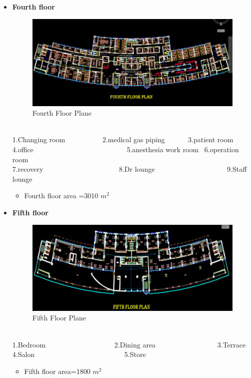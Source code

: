 \documentclass[12pt,fleqn]{book} %
\begin{document}
\begin{itemize}
	    \item \textbf{Fourth floor} 
	     \begin{figure}[h!]
    \centering
    \includegraphics[width=0.8\linewidth]{i 6.png}
    \caption{ Fourth Floor Plane}
    \label{fig:i 6}
\end{figure}

\\1.Changing room \ \ \ \ \ \ \ \ \ \  2.medical gas piping \ \ \ \ \ \  3.patient room
\\4.office \ \ \ \ \ \ \ \ \ \ \ \ \ \ \ \ \ \ \ \ \ \ \ \ \ \ 5.anesthesia work room \  6.operation room
\\7.recovery \ \ \ \ \ \ \ \ \ \ \ \ \ \ \ \ \ \ \ \ \ 8.Dr lounge \ \ \ \ \ \ \ \ \ \ \ \ \ \ \  \ \ \ \ \  9.Staff lounge
\begin{itemize}
    \item Fourth floor area =3010 $m^2$
\end{itemize}
\newpage


	    
	    \item \textbf{Fifth floor}
	        \begin{figure}[h!]
    \centering
    \includegraphics[width=0.8\linewidth]{i 7.png}
    \caption{ Fifth Floor Plane}
    \label{fig:i 7}
\end{figure}
\\1.Bedroom \ \ \ \ \ \ \ \ \ \ \ \ \ \ \ \ \ \ \ 2.Dining area \ \ \ \ \ \ \ \ \ \ \ \ \ \ \ \ \ 3.Terrace
\\4.Salon \ \ \  \ \ \ \ \ \ \ \ \ \  \  \ \ \ \ \ \ \ \ \ \ \ 5.Store
\begin{itemize}
    \item Fifth floor area=1800 $m^2$
\end{itemize}


	    
	\end{itemize}
\end{document}
